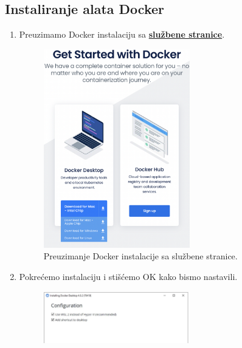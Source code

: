 		\subsection*{Instaliranje alata Docker}
		\begin{enumerate}
			\item Preuzimamo Docker instalaciju sa \textbf{\href{https://docs.docker.com/get-docker/}{službene stranice}}.
			\begin{figure}[h]
				\centering
				\includegraphics[width=0.6\textwidth]{slike/docker_install/0.png}
				\caption{Preuzimanje Docker instalacije sa službene stranice.}
			\end{figure}
			\newpage
			\item Pokrećemo instalaciju i stišćemo OK kako bismo nastavili.
			\begin{figure}[h]
				\centering
				\includegraphics[width=0.6\textwidth]{slike/docker_install/2.png}
				

\end{figure}
\end{enumerate}
